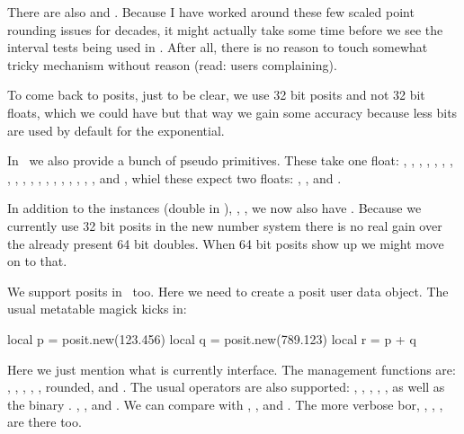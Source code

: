 \startpacked\darkblue \tttf \getbuffer \stoppacked

There are also \typ {\ifintervalfloat} and \typ{\ifintervalnum}. Because I have
worked around these few scaled point rounding issues for decades, it might
actually take some time before we see the interval tests being used in \CONTEXT.
After all, there is no reason to touch somewhat tricky mechanism without reason
(read: users complaining).

To come back to posits, just to be clear, we use 32 bit posits and not 32 bit
floats, which we could have but that way we gain some accuracy because less bits
are used by default for the exponential.

In \CONTEXT\ we also provide a bunch of pseudo primitives. These take one float:
\type {\pfsin}, \type {\pfcos}, \type {\pftan}, \type {\pfasin}, \type {\pfacos},
\type {\pfatan}, \type {\pfsinh}, \type {\pfcosh}, \type {\pftanh}, \type
{\pfasinh}, \type {\pfacosh}, \type {\pfatanh}, \type {\pfsqrt}, \type {\pflog},
\type {\pfexp}, \type {\pfceil}, \type {\pffloor}, \type {\pfround}, \type
{\pfabs}, \type {\pfrad} and \type {\pfdeg}, whiel these expect two floats: \type
{\pfatantwo}, \type {\pfpow}, \type {\pfmod} and \type {\pfrem}.


\stopsectionlevel

\startsectionlevel[title=\METAPOST]

In addition to the instances  (double in \LMTX), ,
,  we now also have . Because we
currently use 32 bit posits in the new number system there is no real gain over
the already present 64 bit doubles. When 64 bit posits show up we might move on
to that.

\stopsectionlevel

\startsectionlevel[title=\LUA]

We support posits in \LUA\ too. Here we need to create a posit user data
object. The usual metatable magick kicks in:

\starttyping
local p = posit.new(123.456)
local q = posit.new(789.123)
local r = p + q
\stoptyping

Here we just mention what is currently interface. The management functions are:
, , , , , \typ
{rounded},  and . The usual operators are also
supported: \type{+}, \type{-}, \type{*}, \type{/}, \type{^}, as well as the
binary \type {|}. \type {&}, \type {~}, \type {<<} and \type {>>}. We can compare
with \type {==}, \type {>=}, \type {<=} and \type {~=}. The more verbose \type
{bor}, , , ,  are there too.

